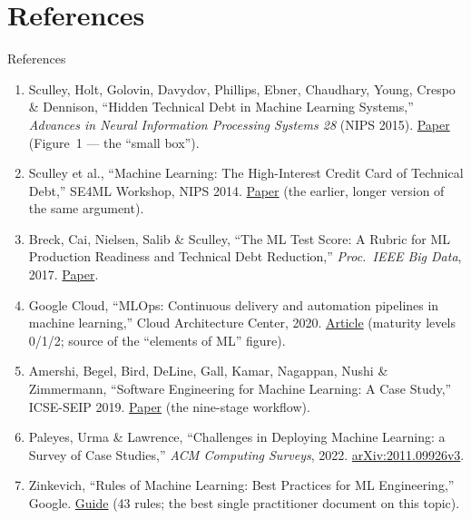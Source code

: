 \section{References}

\begin{frame}[allowframebreaks]{References}
  \footnotesize
  \begin{enumerate}
    \item Sculley, Holt, Golovin, Davydov, Phillips, Ebner, Chaudhary, Young, Crespo \& Dennison,
          ``Hidden Technical Debt in Machine Learning Systems,'' \textit{Advances in Neural Information
          Processing Systems 28} (NIPS 2015).
          \href{https://proceedings.neurips.cc/paper_files/paper/2015/hash/86df7dcfd896fcaf2674f757a2463eba-Abstract.html}{Paper}
          (Figure~1 --- the ``small box'').
    \item Sculley et al., ``Machine Learning: The High-Interest Credit Card of Technical Debt,''
          SE4ML Workshop, NIPS 2014.
          \href{https://research.google/pubs/machine-learning-the-high-interest-credit-card-of-technical-debt/}{Paper}
          (the earlier, longer version of the same argument).
    \item Breck, Cai, Nielsen, Salib \& Sculley, ``The ML Test Score: A Rubric for ML Production Readiness
          and Technical Debt Reduction,'' \textit{Proc.\ IEEE Big Data}, 2017.
          \href{https://research.google/pubs/the-ml-test-score-a-rubric-for-ml-production-readiness-and-technical-debt-reduction/}{Paper}.
    \item Google Cloud, ``MLOps: Continuous delivery and automation pipelines in machine learning,''
          Cloud Architecture Center, 2020.
          \href{https://cloud.google.com/architecture/mlops-continuous-delivery-and-automation-pipelines-in-machine-learning}{Article}
          (maturity levels 0/1/2; source of the ``elements of ML'' figure).
    \item Amershi, Begel, Bird, DeLine, Gall, Kamar, Nagappan, Nushi \& Zimmermann, ``Software Engineering
          for Machine Learning: A Case Study,'' ICSE-SEIP 2019.
          \href{https://www.microsoft.com/en-us/research/publication/software-engineering-for-machine-learning-a-case-study/}{Paper}
          (the nine-stage workflow).
    \item Paleyes, Urma \& Lawrence, ``Challenges in Deploying Machine Learning: a Survey of Case Studies,''
          \textit{ACM Computing Surveys}, 2022. \href{https://arxiv.org/abs/2011.09926v3}{arXiv:2011.09926v3}.
    \item Zinkevich, ``Rules of Machine Learning: Best Practices for ML Engineering,'' Google.
          \href{https://developers.google.com/machine-learning/guides/rules-of-ml}{Guide}
          (43 rules; the best single practitioner document on this topic).


\end{enumerate}
\end{frame}
